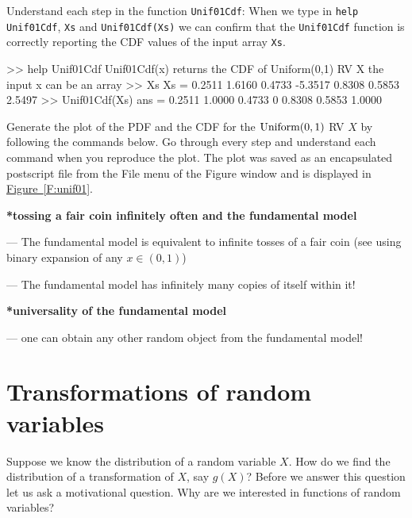 {\begin{labwork}\label{LW:Unif01Cdf}
Understand each step in the function {\tt Unif01Cdf}:
When we type in {\tt help Unif01Cdf}, {\tt Xs} and {\tt Unif01Cdf(Xs)} we can confirm that the {\tt Unif01Cdf} function is correctly reporting the CDF values of the input array {\tt Xs}.
\begin{VrbM}
>> help Unif01Cdf
  Unif01Cdf(x) returns the CDF of Uniform(0,1) RV X
  the input x can be an array 
>> Xs
Xs =    0.2511    1.6160    0.4733   -5.3517    0.8308    0.5853    2.5497
>> Unif01Cdf(Xs)
ans =    0.2511    1.0000    0.4733         0    0.8308    0.5853    1.0000
\end{VrbM}
\end{labwork}

\begin{labwork}\label{LW:PlotUnif01PdfCdf}
Generate the plot of the PDF and the CDF for the $\mbox{{\rm Uniform}}(0,1)$ RV $X$ by following the commands below.  Go through every step and understand each command when you reproduce the plot.
The plot was saved as an encapsulated postscript file from the File menu of the Figure window and is displayed in \hyperref[F:unif01]{Figure~\ref*{F:unif01}}.
 \end{labwork}
}

{\bf **tossing a fair coin infinitely often and the fundamental model}


--- The fundamental model is equivalent to infinite tosses of a fair coin (see using binary expansion of any $x \in (0,1)$)

--- The fundamental model has infinitely many copies of itself within it!


{\bf **universality of the fundamental model}

--- one can obtain any other random object from the fundamental model!

\section{Transformations of random variables}\label{S:TransformationsOFRvs}

Suppose we know the distribution of a random variable $X$.  How do we find the distribution of a transformation of $X$, say $g(X)$?
Before we answer this question let us ask a motivational question.  Why are we interested in functions of random variables?

